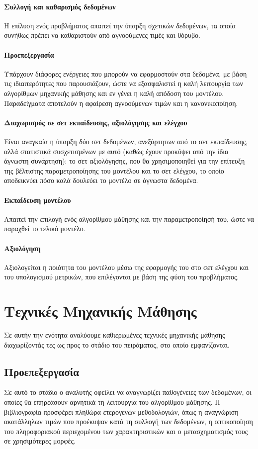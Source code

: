 \begin{minipage}{0.48\textwidth}
	\paragraph{Συλλογή και καθαρισμός δεδομένων} Η επίλυση ενός προβλήματος απαιτεί την ύπαρξη σχετικών δεδομένων, τα οποία συνήθως πρέπει να καθαριστούν από αγνοούμενες τιμές και θόρυβο. 
	\paragraph{Προεπεξεργασία} Υπάρχουν διάφορες ενέργειες που μπορούν να εφαρμοστούν στα δεδομένα, με βάση τις ιδιαιτερότητες που παρουσιάζουν, ώστε να εξασφαλιστεί η καλή λειτουργία των αλγορίθμων μηχανικής μάθησης και εν γένει η καλή απόδοση του μοντέλου. Παραδείγματα αποτελούν η αφαίρεση αγνοούμενων τιμών και η κανονικοποίηση.
	\paragraph{Διαχωρισμός σε σετ εκπαίδευσης, αξιολόγησης και ελέγχου} Είναι αναγκαία η ύπαρξη δύο σετ δεδομένων, ανεξάρτητων από το σετ εκπαίδευσης, αλλά στατιστικά συσχετισμένων με αυτό (καθώς έχουν προκύψει από την ίδια άγνωστη συνάρτηση): το σετ αξιολόγησης, που θα χρησιμοποιηθεί για την επίτευξη της βέλτιστης παραμετροποίησης του μοντέλου  και το σετ ελέγχου, το οποίο αποδεικνύει πόσο καλά δουλεύει το μοντέλο σε άγνωστα δεδομένα.
    \paragraph{Εκπαίδευση μοντέλου} Απαιτεί την επιλογή ενός αλγορίθμου μάθησης και την παραμετροποίησή του, ώστε να παραχθεί το τελικό μοντέλο.
	\paragraph{Αξιολόγηση} Αξιολογείται η ποιότητα του μοντέλου μέσω της εφαρμογής του στο σετ ελέγχου και του υπολογισμού μετρικών, που επιλέγονται με βάση της φύση του προβλήματος.
\end{minipage}
\section{Τεχνικές Μηχανικής Μάθησης}
Σε αυτήν την ενότητα αναλύουμε καθιερωμένες τεχνικές μηχανικής μάθησης διαχωρίζοντάς τες ως προς το στάδιο του πειράματος, στο οποίο εμφανίζονται.
\subsection{Προεπεξεργασία} Σε αυτό το στάδιο ο αναλυτής οφείλει να αναγνωρίζει παθογένειες των δεδομένων, οι οποίες θα επηρεάσουν αρνητικά τη λειτουργία του αλγορίθμου μάθησης. Η βιβλιογραφία προσφέρει πληθώρα ετερογενών μεθοδολογιών, όπως η αναγνώριση ακατάλληλων τιμών που προέκυψαν κατά τη συλλογή των δεδομένων, η οπτικοποίηση του πληροφοριακού περιεχομένου των χαρακτηριστικών και ο μετασχηματισμός τους σε χρησιμότερες μορφές.  

